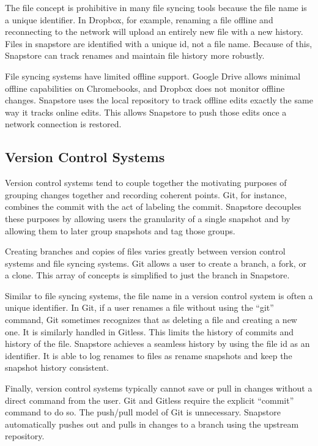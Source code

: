 The file concept is prohibitive in many file syncing tools because the file name is a unique identifier. In Dropbox, for example, renaming a file offline and reconnecting to the network will upload an entirely new file with a new history. Files in snapstore are identified with a unique id, not a file name. Because of this, Snapstore can track renames and maintain file history more robustly.

File syncing systems have limited offline support. Google Drive allows minimal offline capabilities on Chromebooks, and Dropbox does not monitor offline changes. Snapstore uses the local repository to track offline edits exactly the same way it tracks online edits. This allows Snapstore to push those edits once a network connection is restored.

\subsection{Version Control Systems}

Version control systems tend to couple together the motivating purposes of grouping changes together and recording coherent points. Git, for instance, combines the commit with the act of labeling the commit. Snapstore decouples these purposes by allowing users the granularity of a single snapshot and by allowing them to later group snapshots and tag those groups.

Creating branches and copies of files varies greatly between version control systems and file syncing systems. Git allows a user to create a branch, a fork, or a clone. This array of concepts is simplified to just the branch in Snapstore. 

Similar to file syncing systems, the file name in a version control system is often a unique identifier. In Git, if a user renames a file without using the ``git'' command, Git sometimes recognizes that as deleting a file and creating a new one. It is similarly handled in Gitless. This limits the history of commits and history of the file. Snapstore achieves a seamless history by using the file id as an identifier. It is able to log renames to files as rename snapshots and keep the snapshot history consistent.

Finally, version control systems typically cannot save or pull in changes without a direct command from the user. Git and Gitless require the explicit ``commit'' command to do so. The push/pull model of Git is unnecessary. Snapstore automatically pushes out and pulls in changes to a branch using the upstream repository.




